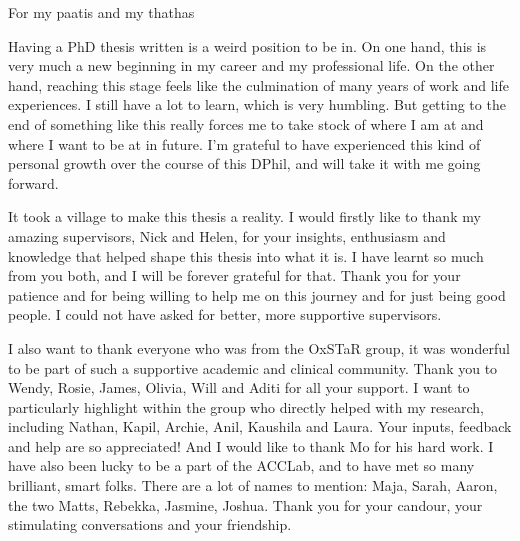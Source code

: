 \documentclass[a4paper, nobind]{templates/ociamthesis}
\begin{document}
\setcounter{secnumdepth}{2}
\setcounter{tocdepth}{1}



\begin{romanpages}

\maketitle

\begin{dedication}
  For my paatis and my thathas
\end{dedication}



\begin{acknowledgements}
 	Having a PhD thesis written is a weird position to be in. On one hand, this is very much a new beginning in my career and my professional life. On the other hand, reaching this stage feels like the culmination of many years of work and life experiences. I still have a lot to learn, which is very humbling. But getting to the end of something like this really forces me to take stock of where I am at and where I want to be at in future. I'm grateful to have experienced this kind of personal growth over the course of this DPhil, and will take it with me going forward.

 \hfill\break
 It took a village to make this thesis a reality. I would firstly like to thank my amazing supervisors, Nick and Helen, for your insights, enthusiasm and knowledge that helped shape this thesis into what it is. I have learnt so much from you both, and I will be forever grateful for that. Thank you for your patience and for being willing to help me on this journey and for just being good people. I could not have asked for better, more supportive supervisors.

 \hfill\break
 I also want to thank everyone who was from the OxSTaR group, it was wonderful to be part of such a supportive academic and clinical community. Thank you to Wendy, Rosie, James, Olivia, Will and Aditi for all your support. I want to particularly highlight within the group who directly helped with my research, including Nathan, Kapil, Archie, Anil, Kaushila and Laura. Your inputs, feedback and help are so appreciated! And I would like to thank Mo for his hard work. I have also been lucky to be a part of the ACCLab, and to have met so many brilliant, smart folks. There are a lot of names to mention: Maja, Sarah, Aaron, the two Matts, Rebekka, Jasmine, Joshua. Thank you for your candour, your stimulating conversations and your friendship.


\end{acknowledgements}
\end{romanpages}
\end{document}
